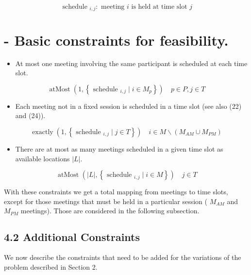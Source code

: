\documentclass[10pt]{article}
\begin{document}
$$
\text { schedule }_{i, j}: \text { meeting } i \text { is held at time slot } j
$$

\section*{- Basic constraints for feasibility.}
\begin{itemize}
  \item At most one meeting involving the same participant is scheduled at each time slot.
\end{itemize}


\begin{equation*}
\operatorname{atMost}\left(1,\left\{\text { schedule }_{i, j} \mid i \in M_{p}\right\}\right) \quad p \in P, j \in T \tag{19}
\end{equation*}


\begin{itemize}
  \item Each meeting not in a fixed session is scheduled in a time slot (see also (22) and (24)).
\end{itemize}


\begin{equation*}
\operatorname{exactly}\left(1,\left\{\text { schedule }_{i, j} \mid j \in T\right\}\right) \quad i \in M \backslash\left(M_{A M} \cup M_{P M}\right) \tag{20}
\end{equation*}

\captionsetup{singlelinecheck=false}
\begin{itemize}
  \item There are at most as many meetings scheduled in a given time slot as available locations $|L|$.
\end{itemize}


\begin{equation*}
\text { atMost }\left(|L|,\left\{\text { schedule }_{i, j} \mid i \in M\right\}\right) \quad j \in T \tag{21}
\end{equation*}


With these constraints we get a total mapping from meetings to time slots, except for those meetings that must be held in a particular session ( $M_{A M}$ and $M_{P M}$ meetings). Those are considered in the following subsection.

\subsection*{4.2 Additional Constraints}
We now describe the constraints that need to be added for the variations of the problem described in Section 2.
\end{document}
